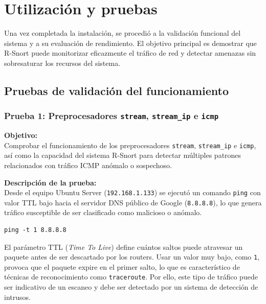 \documentclass[11pt,a4paper,twoside]{report}
\begin{document}
\pagebreak



\section{Utilización y pruebas}
\label{sec:pruebas}

Una vez completada la instalación, se procedió a la validación funcional del sistema y a su evaluación de rendimiento. El objetivo principal es demostrar que R-Snort puede monitorizar eficazmente el tráfico de red y detectar amenazas sin sobresaturar los recursos del sistema.

\subsection{Pruebas de validación del funcionamiento}

\subsubsection*{Prueba 1: Preprocesadores \texttt{stream}, \texttt{stream\_ip} e \texttt{icmp}}

\textbf{Objetivo:} \\
Comprobar el funcionamiento de los preprocesadores \texttt{stream}, \texttt{stream\_ip} e \texttt{icmp}, así como la capacidad del sistema R-Snort para detectar múltiples patrones relacionados con tráfico ICMP anómalo o sospechoso.\newline

\textbf{Descripción de la prueba:} \\
Desde el equipo Ubuntu Server (\texttt{192.168.1.133}) se ejecutó un comando \texttt{ping} con valor TTL bajo hacia el servidor DNS público de Google (\texttt{8.8.8.8}), lo que genera tráfico susceptible de ser clasificado como malicioso o anómalo.

\begin{lstlisting}[style=commandstyle, caption={Comando para realizar un ping.}]
	ping -t 1 8.8.8.8
\end{lstlisting}

El parámetro TTL (\textit{Time To Live}) define cuántos saltos puede atravesar un paquete antes de ser descartado por los routers. Usar un valor muy bajo, como \texttt{1}, provoca que el paquete expire en el primer salto, lo que es característico de técnicas de reconocimiento como \texttt{traceroute}. Por ello, este tipo de tráfico puede ser indicativo de un escaneo y debe ser detectado por un sistema de detección de intrusos.\newline
\end{document}
